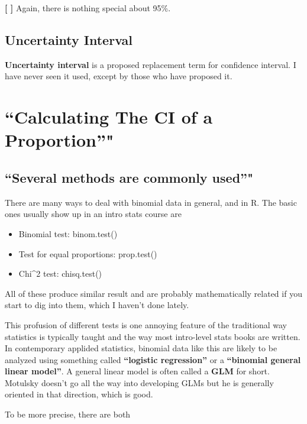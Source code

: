 \documentclass[]{book}
\providecommand{\tightlist}{%
  \setlength{\itemsep}{0pt}\setlength{\parskip}{0pt}}
\theoremstyle{definition}
\theoremstyle{definition}
\theoremstyle{definition}
\theoremstyle{remark}
\begin{document}
\textbf{{[} {]}} Again, there is nothing special about 95\%.

\subsection{Uncertainty Interval}\label{uncertainty-interval}

\textbf{Uncertainty interval} is a proposed replacement term for
confidence interval. I have never seen it used, except by those who have
proposed it.

\section{\texorpdfstring{``Calculating The CI of a
Proportion''"}{Calculating The CI of a Proportion"}}\label{calculating-the-ci-of-a-proportion}

\subsection{\texorpdfstring{``Several methods are commonly
used''"}{Several methods are commonly used"}}\label{several-methods-are-commonly-used}

There are many ways to deal with binomial data in general, and in R. The
basic ones usually show up in an intro stats course are

\begin{itemize}
\tightlist
\item
  Binomial test: binom.test()
\item
  Test for equal proportions: prop.test()
\item
  Chi\^{}2 test: chisq.test()
\end{itemize}

All of these produce similar result and are probably mathematically
related if you start to dig into them, which I haven't done lately.

This profusion of different tests is one annoying feature of the
traditional way statistics is typically taught and the way most
intro-level stats books are written. In contemporary applided
statistics, binomial data like this are likely to be analyzed using
something called \textbf{``logistic regression''} or a
\textbf{``binomial general linear model''}. A general linear model is
often called a \textbf{GLM} for short. Motulsky doesn't go all the way
into developing GLMs but he is generally oriented in that direction,
which is good.

To be more precise, there are both
\end{document}
